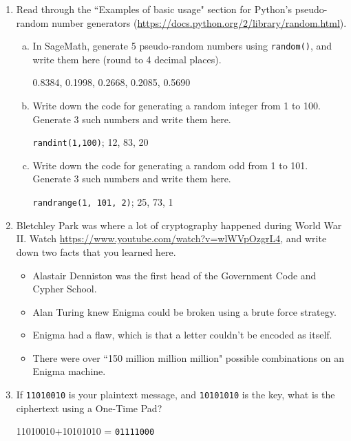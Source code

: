 \documentclass[12pt]{amsart}
\theoremstyle{plain}
\theoremstyle{definition}
\begin{document}
\begin{enumerate}[1.]
	\item Read through the ``Examples of basic usage" section for Python's pseudo-random number generators (\url{https://docs.python.org/2/library/random.html}).
	\begin{enumerate}[a.]
		\item In SageMath, generate 5 pseudo-random numbers using \texttt{random()}, and write them here (round to 4 decimal places).
			\begin{framed}
			0.8384, 0.1998, 0.2668, 0.2085, 0.5690
			\end{framed}
		\item Write down the code for generating a random integer from 1 to 100.  Generate 3 such numbers and write them here.
			\begin{framed}
			\texttt{randint(1,100)}; 12, 83, 20
			\end{framed}
		 \item Write down the code for generating a random odd from 1 to 101.  Generate 3 such numbers and write them here.
			\begin{framed}
			\texttt{randrange(1, 101, 2)}; 25, 73, 1
			\end{framed}
	\end{enumerate}
	\item Bletchley Park was where a lot of cryptography happened during World War II.  Watch \url{https://www.youtube.com/watch?v=wlWVpOzgrL4}, and write down two facts that you learned here.
	\begin{framed}
	\begin{itemize}
		\item Alastair Denniston was the first head of the Government Code and Cypher School.
		\item Alan Turing knew Enigma could be broken using a brute force strategy.
		\item Enigma had a flaw, which is that a letter couldn't be encoded as itself.
		\item There were over ``150 million million million" possible combinations on an Enigma machine.
	\end{itemize}
	\end{framed}
	\item If \texttt{11010010} is your plaintext message, and \texttt{10101010} is the key, what is the ciphertext using a One-Time Pad? 
	\begin{framed}
	11010010+10101010 = \texttt{01111000}
	\end{framed}

\end{enumerate}
\end{document}
